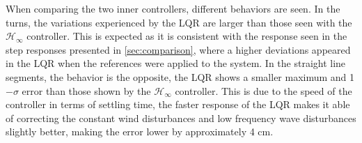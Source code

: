 When comparing the two inner controllers, different behaviors are seen. In the turns, the variations experienced by the LQR are larger than those seen with the $\mathcal{H}_\infty$ controller. This is expected as it is consistent with the response seen in the step responses presented in \autoref{sec:comparison}, where a higher deviations appeared in the LQR when the references were applied to the system. 
In the straight line segments, the behavior is the opposite, the LQR shows a smaller maximum and 1$-\sigma$ error than those shown by the $\mathcal{H}_\infty$ controller. This is due to the speed of the controller in terms of settling time, the faster response of the LQR makes it able of correcting the constant wind disturbances and low frequency wave disturbances slightly better, making the error lower by approximately 4 cm.
